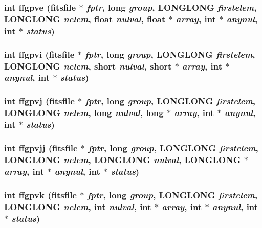 \subsubsection{\setlength{\rightskip}{0pt plus 5cm}int ffgpve (\bf{fitsfile} $\ast$ {\em fptr}, long {\em group}, \bf{LONGLONG} {\em firstelem}, \bf{LONGLONG} {\em nelem}, float {\em nulval}, float $\ast$ {\em array}, int $\ast$ {\em anynul}, int $\ast$ {\em status})}\label{fitsio_8h_aec726a6192a5cb163c2be7496ba41ff}


\subsubsection{\setlength{\rightskip}{0pt plus 5cm}int ffgpvi (\bf{fitsfile} $\ast$ {\em fptr}, long {\em group}, \bf{LONGLONG} {\em firstelem}, \bf{LONGLONG} {\em nelem}, short {\em nulval}, short $\ast$ {\em array}, int $\ast$ {\em anynul}, int $\ast$ {\em status})}\label{fitsio_8h_5cf08cc899b11b18350ec1def017de1d}


\subsubsection{\setlength{\rightskip}{0pt plus 5cm}int ffgpvj (\bf{fitsfile} $\ast$ {\em fptr}, long {\em group}, \bf{LONGLONG} {\em firstelem}, \bf{LONGLONG} {\em nelem}, long {\em nulval}, long $\ast$ {\em array}, int $\ast$ {\em anynul}, int $\ast$ {\em status})}\label{fitsio_8h_5b4c250bd7e498f28600d4850216cb56}


\subsubsection{\setlength{\rightskip}{0pt plus 5cm}int ffgpvjj (\bf{fitsfile} $\ast$ {\em fptr}, long {\em group}, \bf{LONGLONG} {\em firstelem}, \bf{LONGLONG} {\em nelem}, \bf{LONGLONG} {\em nulval}, \bf{LONGLONG} $\ast$ {\em array}, int $\ast$ {\em anynul}, int $\ast$ {\em status})}\label{fitsio_8h_139575618933a88582c86f742063f0c4}


\subsubsection{\setlength{\rightskip}{0pt plus 5cm}int ffgpvk (\bf{fitsfile} $\ast$ {\em fptr}, long {\em group}, \bf{LONGLONG} {\em firstelem}, \bf{LONGLONG} {\em nelem}, int {\em nulval}, int $\ast$ {\em array}, int $\ast$ {\em anynul}, int $\ast$ {\em status})}\label{fitsio_8h_0cbefb3447c77eb4e19523c9c0f36464}


